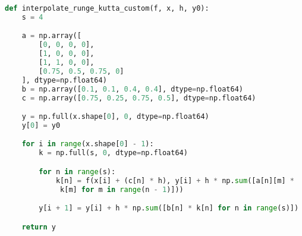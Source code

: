 \documentclass[../ZF_HM2.tex]{subfiles}
\begin{document}
\begin{lstlisting}[language=python]
def interpolate_runge_kutta_custom(f, x, h, y0):
    s = 4

    a = np.array([
        [0, 0, 0, 0],
        [1, 0, 0, 0],
        [1, 1, 0, 0],
        [0.75, 0.5, 0.75, 0]
    ], dtype=np.float64)
    b = np.array([0.1, 0.1, 0.4, 0.4], dtype=np.float64)
    c = np.array([0.75, 0.25, 0.75, 0.5], dtype=np.float64)

    y = np.full(x.shape[0], 0, dtype=np.float64)
    y[0] = y0

    for i in range(x.shape[0] - 1):
        k = np.full(s, 0, dtype=np.float64)

        for n in range(s):
            k[n] = f(x[i] + (c[n] * h), y[i] + h * np.sum([a[n][m] *
             k[m] for m in range(n - 1)]))

        y[i + 1] = y[i] + h * np.sum([b[n] * k[n] for n in range(s)])

    return y

\end{lstlisting}
\end{document}
